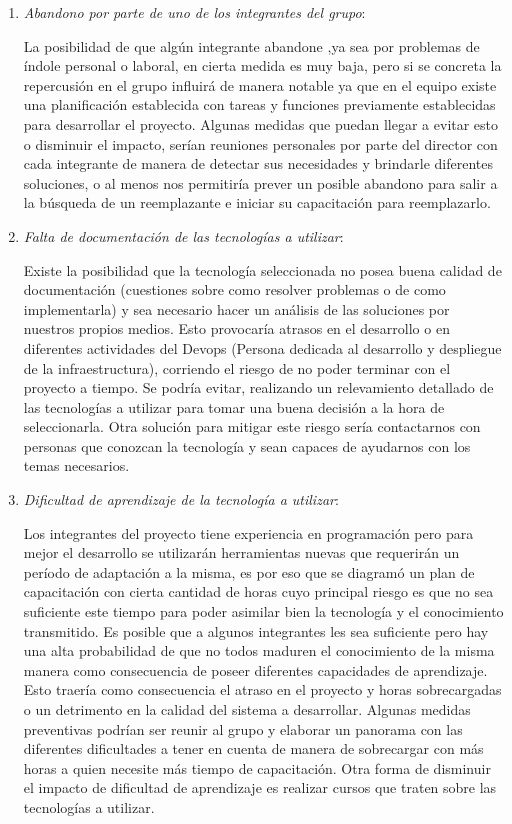 \begin{enumerate}
\item \textit{Abandono por parte de uno de los integrantes del grupo}:

La posibilidad de que algún integrante abandone ,ya sea por problemas de índole personal o laboral, en cierta medida es muy baja, pero si se concreta la repercusión en el grupo influirá de manera notable ya que en el equipo existe una planificación establecida con tareas y funciones previamente establecidas para desarrollar el proyecto. Algunas medidas que puedan llegar a evitar esto o disminuir el impacto, serían reuniones personales por parte del director con cada integrante de manera de detectar sus necesidades y brindarle diferentes soluciones, o al menos nos permitiría prever un posible abandono para salir a la búsqueda de un reemplazante e iniciar su capacitación para reemplazarlo.

\item \textit{Falta de documentación de las tecnologías a utilizar}:

Existe la posibilidad que la tecnología seleccionada no posea buena calidad de documentación (cuestiones sobre como resolver problemas o de como implementarla) y sea necesario hacer un análisis de las soluciones por nuestros propios medios. Esto provocaría atrasos en el desarrollo o en diferentes actividades del Devops (Persona dedicada al desarrollo y despliegue de la infraestructura), corriendo el riesgo de no poder terminar con el proyecto a tiempo. Se podría evitar, realizando un relevamiento detallado de las tecnologías a utilizar para tomar una buena decisión a la hora de seleccionarla. Otra solución para mitigar este riesgo sería contactarnos con personas que conozcan la tecnología y sean capaces de ayudarnos con los temas necesarios.

\item \textit{Dificultad de aprendizaje de la tecnología a utilizar}:

Los integrantes del proyecto tiene experiencia en programación pero para mejor el desarrollo se utilizarán herramientas nuevas que requerirán un período de adaptación a la misma, es por eso que se diagramó un plan de capacitación con cierta cantidad de horas cuyo principal riesgo es que no sea suficiente este tiempo para poder asimilar bien la tecnología y el conocimiento transmitido. Es posible que a algunos integrantes les sea suficiente pero hay una alta probabilidad de que no todos maduren el conocimiento de la misma manera como consecuencia de poseer diferentes capacidades de aprendizaje. Esto traería como consecuencia el atraso en el proyecto y horas sobrecargadas o un detrimento en la calidad del sistema a desarrollar. Algunas medidas preventivas podrían ser reunir al grupo y  elaborar un panorama con las diferentes dificultades a tener en cuenta de manera de sobrecargar con más horas a quien necesite más tiempo de capacitación. Otra forma de disminuir el impacto de dificultad de aprendizaje es realizar cursos que traten sobre las tecnologías a utilizar.


\end{enumerate}

